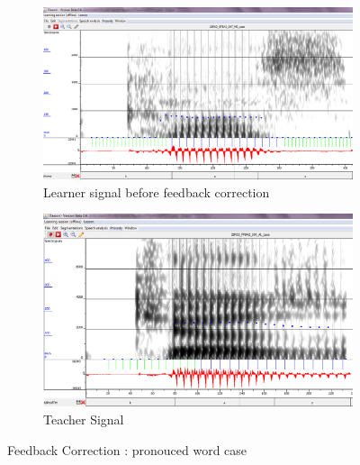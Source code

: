 \documentclass[11pt]{beamer}
\begin{document}
\begin{frame}

\begin{figure}
\begin{subfigure}{.5\textwidth}
  \centering
  \includegraphics[width=0.9\linewidth]{images/case_learner.PNG}
  \caption{Learner signal before feedback correction}
  \label{fig:sfig1}
\end{subfigure}%
\begin{subfigure}{.5\textwidth}
  \centering
  \includegraphics[width=0.9\linewidth]{images/teacher_case.PNG}
  \caption{Teacher Signal}
  \label{fig:sfig2}
\end{subfigure}
\caption{Feedback Correction : pronouced word case}
\label{fig:fig}
\end{figure}
\end{frame}
\end{document}
